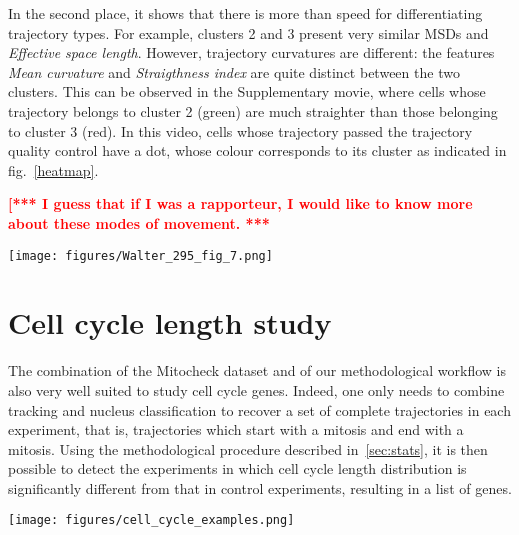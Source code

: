 In the second place, it shows that there is more than speed for
differentiating trajectory types. For example, clusters 2 and 3
present very similar MSDs and \textit{Effective space
  length}. However, trajectory curvatures are different: the features
\textit{Mean curvature} and \textit{Straigthness index} are quite
distinct between the two clusters. This can be observed in the
Supplementary movie, where cells whose trajectory belongs to cluster 2
(green) are much straighter than those belonging to cluster 3
(red). In this video, cells whose trajectory passed the trajectory
quality control have a dot, whose colour corresponds to its cluster as
indicated in fig.~\ref{heatmap}. 

\textcolor{red}{\bf [*** I guess that if I was a rapporteur, I would
  like to know more about these modes of movement. ***}

\begin{figure*}[t!]
\centerline{\texttt{[image: figures/Walter\_295\_fig\_7.png]}}
\caption{Characterization of our ontology of trajectories. Each column is a single cell trajectory ; trajectories are grouped by cluster label. 1,000 trajectories were randomly selected per trajectory cluster.}
\label{heatmap}
\end{figure*}
\section{Cell cycle length study}
\label{sec:cellcycle}
The combination of the Mitocheck dataset and of our methodological
workflow is also very well suited to study cell cycle genes. Indeed,
one only needs to combine tracking and nucleus classification to
recover a set of complete trajectories in each experiment, that is,
trajectories which start with a mitosis and end with a mitosis. Using
the methodological procedure described in~\ref{sec:stats}, it is then
possible to detect the experiments in which cell cycle length
distribution is significantly different from that in control
experiments, resulting in a list of genes. 
\begin{figure*}[ht!]
\centerline{\texttt{[image: figures/cell\_cycle\_examples.png]}}
\caption{Examples of object divisions from the Mitocheck dataset}
\label{cellcycle2}
\end{figure*}
